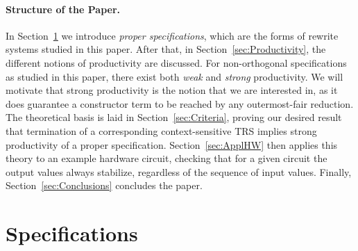 \documentclass{eptcs}
\begin{document}
\paragraph{Structure of the Paper.} In Section~\ref{sec:Specifications} we
introduce \emph{proper specifications}, which are the forms of rewrite systems
studied in this paper. After that, in Section~\ref{sec:Productivity}, the
different notions of productivity are discussed. For non-orthogonal
specifications as studied in this paper, there exist both \emph{weak} and
\emph{strong} productivity. We will motivate that strong productivity is the
notion that we are interested in, as it does guarantee a constructor term to
be reached by any outermost-fair reduction.
The theoretical basis is laid in Section~\ref{sec:Criteria},
proving our desired result that termination of a corresponding context-sensitive
TRS implies strong productivity of a proper specification.
Section~\ref{sec:ApplHW} then applies this theory to an example hardware
circuit, checking that for a given circuit the output values always stabilize,
regardless of the sequence of input values.
Finally, Section~\ref{sec:Conclusions} concludes the paper.

\section{Specifications}
\label{sec:Specifications}
\end{document}
